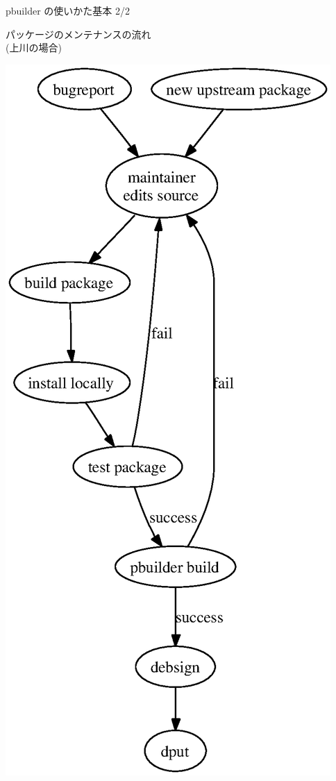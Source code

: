 \documentclass[cjk,dvipdfmx,12pt]{beamer}
\begin{document}
\begin{frame}{pbuilder の使いかた基本 2/2}
\begin{minipage}{0.4\hsize}
パッケージのメンテナンスの流れ
\\
(上川の場合)
\end{minipage}
\begin{minipage}{0.5\hsize}
  \includegraphics[height=0.8\vsize]{image200705/develcycle.eps}
\end{minipage}
\end{frame}
\end{document}
